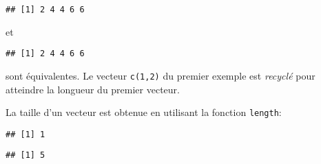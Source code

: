\begin{knitrout}
\color{fgcolor}\begin{kframe}
\begin{flushleft}
\ttfamily\noindent
{}\hlkeyword{(}\hlkeyword{,}{\ }\hlkeyword{,}{\ }\hlkeyword{,}{\ }\hlkeyword{,}{\ }\hlkeyword{)}{\ }\hlkeyword{+}{\ }\hlkeyword{(}\hlkeyword{,}{\ }\hlkeyword{)}\mbox{}
\normalfont
\end{flushleft}
\begin{verbatim}
## [1] 2 4 4 6 6
\end{verbatim}
\end{kframe}
\end{knitrout}


\noindent et

\begin{knitrout}
\color{fgcolor}\begin{kframe}
\begin{flushleft}
\ttfamily\noindent
{}\hlkeyword{(}\hlkeyword{,}{\ }\hlkeyword{,}{\ }\hlkeyword{,}{\ }\hlkeyword{,}{\ }\hlkeyword{)}{\ }\hlkeyword{+}{\ }\hlkeyword{(}\hlkeyword{,}{\ }\hlkeyword{,}{\ }\hlkeyword{,}{\ }\hlkeyword{,}{\ }\hlkeyword{)}\mbox{}
\normalfont
\end{flushleft}
\begin{verbatim}
## [1] 2 4 4 6 6
\end{verbatim}
\end{kframe}
\end{knitrout}


\noindent sont équivalentes.
Le vecteur \texttt{c(1,2)} du premier exemple est \emph{recyclé} pour atteindre la longueur du premier vecteur.

La taille d'un vecteur est obtenue en utilisant la fonction \texttt{length}:

\begin{knitrout}
\color{fgcolor}\begin{kframe}
\begin{flushleft}
\ttfamily\noindent
{}\hlkeyword{(}\hlkeyword{)}\mbox{}
\normalfont
\end{flushleft}
\begin{verbatim}
## [1] 1
\end{verbatim}
\begin{flushleft}
\ttfamily\noindent
{}\hlkeyword{(}\hlkeyword{(}\hlkeyword{:}\hlkeyword{)}\hlkeyword{)}\mbox{}
\normalfont
\end{flushleft}
\begin{verbatim}
## [1] 5
\end{verbatim}
\end{kframe}
\end{knitrout}



